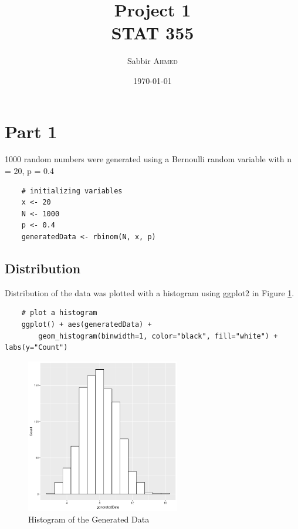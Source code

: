 \documentclass{article}
\title{Project 1 \\ STAT 355} %
\author{Sabbir \textsc{Ahmed}} %
\date{\today} %
\begin{document}
    \maketitle %

    \section{Part 1}
        1000 random numbers were generated using a Bernoulli random variable with n = 20, p = 0.4
\begin{lstlisting}
    # initializing variables
    x <- 20
    N <- 1000
    p <- 0.4
    generatedData <- rbinom(N, x, p)
\end{lstlisting}

        \subsection{Distribution}
            Distribution of the data was plotted with a histogram using ggplot2 in Figure \ref{fig:hist}.
\begin{lstlisting}
    # plot a histogram
    ggplot() + aes(generatedData) + 
        geom_histogram(binwidth=1, color="black", fill="white") + labs(y="Count")
\end{lstlisting}

            \begin{figure}[h]
                \begin{center}
                    \includegraphics[width=0.6\textwidth]{hist.png}
                    \caption{Histogram of the Generated Data} \label{fig:hist}
                \end{center}
            \end{figure}
\end{document}
